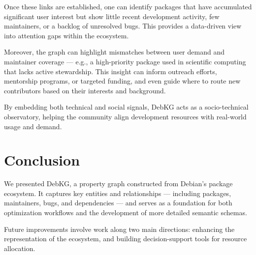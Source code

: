 \documentclass[10pt,oneside,a4paper, twocolumn]{article}
\begin{document}
    Once these links are established, one can identify packages that have accumulated significant user interest but show little recent development activity, few maintainers, or a backlog of unresolved bugs.
    This provides a data-driven view into attention gaps within the ecosystem.

    Moreover, the graph can highlight mismatches between user demand and maintainer coverage — e.g., a high-priority package used in scientific computing that lacks active stewardship.
    This insight can inform outreach efforts, mentorship programs, or targeted funding, and even guide where to route new contributors based on their interests and background.

    By embedding both technical and social signals, DebKG acts as a socio-technical observatory, helping the community align development resources with real-world usage and demand.


    \section{Conclusion}

    We presented DebKG, a property graph constructed from Debian’s package ecosystem.
    It captures key entities and relationships — including packages, maintainers, bugs, and dependencies — and serves as a foundation for both optimization workflows and the development of more detailed semantic schemas.

    Future improvements involve work along two main directions: enhancing the representation of the ecosystem, and building decision-support tools for resource allocation.
\end{document}

